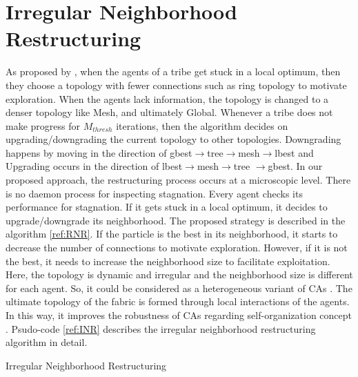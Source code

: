 \section{Irregular Neighborhood Restructuring}
As proposed by \cite{ali2016leveraged}, when the agents of a tribe get stuck in a local optimum, then they choose a topology with fewer connections such as ring topology to motivate exploration. When the agents lack information, the topology is changed to a denser topology like Mesh, and ultimately Global. Whenever a tribe does not make progress for $M_{thresh}$ iterations, then the algorithm decides on upgrading/downgrading the current topology to other topologies. Downgrading happens by moving in the direction of gbest$\rightarrow$tree$\rightarrow$mesh$\rightarrow$lbest and Upgrading occurs in the direction of lbest$\rightarrow$mesh$\rightarrow$tree $\rightarrow$gbest. In our proposed approach, the restructuring process occurs at a microscopic level. There is no daemon process for inspecting stagnation. Every agent checks its performance for stagnation. If it gets stuck in a local optimum, it decides to upgrade/downgrade its neighborhood. The proposed strategy is described in the algorithm \ref{ref:RNR}. If the particle is the best in its neighborhood, it starts to decrease the number of connections to motivate exploration. However, if it is not the best, it needs to increase the neighborhood size to facilitate exploitation. Here, the topology is dynamic and irregular and the neighborhood size is different for each agent. So, it could be considered as a heterogeneous variant of CAs \cite{de2009heterogeneous}. The ultimate topology of the fabric is formed through local interactions of the agents. In this way, it improves the robustness of CAs regarding self-organization concept \cite{kennedy2001swarm}. Psudo-code \ref{ref:INR} describes the irregular neighborhood restructuring algorithm in detail.
\begin{algorithm}{	}
	\caption{Irregular Neighborhood Restructuring}			
\label{ref:INR}
\end{algorithm}
